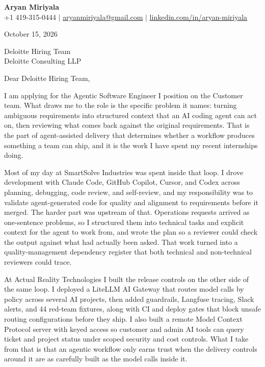 \documentclass[letterpaper,11pt]{article}
\begin{document}
\begin{center}
  {\LARGE \textbf{Aryan Miriyala}}\\[-1pt]
  \small
  +1 419-315-0444 $|$ \href{mailto:aryanmiriyala@gmail.com}{aryanmiriyala@gmail.com} $|$ \href{https://www.linkedin.com/in/aryan-miriyala-7788a21b6/}{linkedin.com/in/aryan-miriyala}
\end{center}

October 15, 2026

Deloitte Hiring Team\\
Deloitte Consulting LLP

Dear Deloitte Hiring Team,

I am applying for the Agentic Software Engineer I position on the Customer team. What draws me to the role is the specific problem it names: turning ambiguous requirements into structured context that an AI coding agent can act on, then reviewing what comes back against the original requirements. That is the part of agent-assisted delivery that determines whether a workflow produces something a team can ship, and it is the work I have spent my recent internships doing.

Most of my day at SmartSolve Industries was spent inside that loop. I drove development with Claude Code, GitHub Copilot, Cursor, and Codex across planning, debugging, code review, and self-review, and my responsibility was to validate agent-generated code for quality and alignment to requirements before it merged. The harder part was upstream of that. Operations requests arrived as one-sentence problems, so I structured them into technical tasks and explicit context for the agent to work from, and wrote the plan so a reviewer could check the output against what had actually been asked. That work turned into a quality-management dependency register that both technical and non-technical reviewers could trace.

At Actual Reality Technologies I built the release controls on the other side of the same loop. I deployed a LiteLLM AI Gateway that routes model calls by policy across several AI projects, then added guardrails, Langfuse tracing, Slack alerts, and 44 red-team fixtures, along with CI and deploy gates that block unsafe routing configurations before they ship. I also built a remote Model Context Protocol server with keyed access so customer and admin AI tools can query ticket and project status under scoped security and cost controls. What I take from that is that an agentic workflow only earns trust when the delivery controls around it are as carefully built as the model calls inside it.
\end{document}
